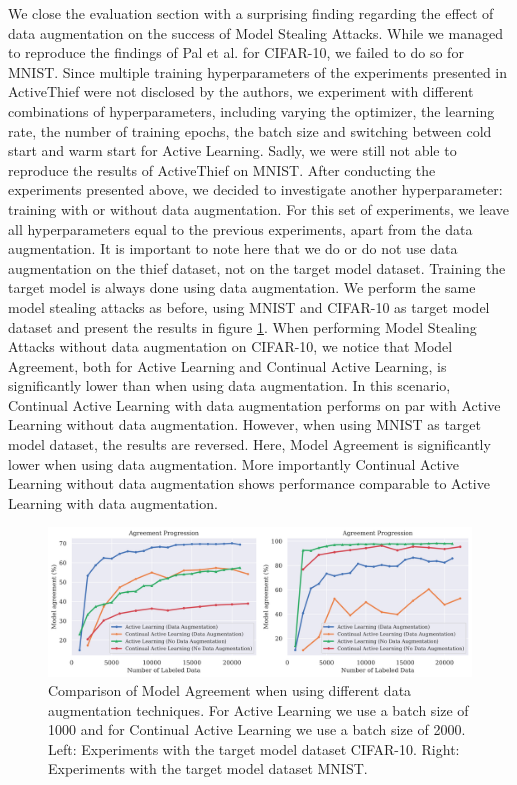 We close the evaluation section with a surprising finding regarding the effect of data augmentation on the success of Model Stealing Attacks. While
we managed to reproduce the findings of Pal et al. for CIFAR-10, we failed to do so for MNIST. Since multiple training hyperparameters of the experiments
presented in ActiveThief were not disclosed by the authors, we experiment with different combinations of hyperparameters, including varying the optimizer,
the learning rate, the number of training epochs, the batch size and switching between cold start and warm start for Active Learning. Sadly, we were still
not able to reproduce the results of ActiveThief on MNIST. After conducting the experiments presented above, we decided to investigate another hyperparameter:
training with or without data augmentation. For this set of experiments, we leave all hyperparameters equal to the previous experiments, apart from the data
augmentation. It is important to note here that we do or do not use data augmentation on the thief dataset, not on the target model dataset. Training the
target model is always done using data augmentation. We perform the same model stealing attacks as before, using MNIST and CIFAR-10 as target model dataset
and present the results in figure \ref{fig:Evaluation:Results:CAL:EffectAugmentation}. When performing Model Stealing Attacks without data augmentation on
CIFAR-10, we notice that Model Agreement, both for Active Learning and Continual Active Learning, is significantly lower than when using data augmentation.
In this scenario, Continual Active Learning with data augmentation performs on par with Active Learning without data augmentation. However, when using MNIST
as target model dataset, the results are reversed. Here, Model Agreement is significantly lower when using data augmentation. More importantly Continual
Active Learning without data augmentation shows performance comparable to Active Learning with data augmentation. \par

\begin{figure}[h]
    \centering
    \includegraphics[width=\linewidth]{images/results_CALMS/effect_data_augmentation.png}
    \caption[Effect of Data Augmentation on the success of Model Stealing Attacks]{Comparison of Model Agreement when using different data augmentation
    techniques. For Active Learning we use a batch size of 1000 and for Continual Active Learning we use a batch size of 2000. Left: Experiments with
    the target model dataset CIFAR-10. Right: Experiments with the target model dataset MNIST.}
    \label{fig:Evaluation:Results:CAL:EffectAugmentation}
\end{figure}
